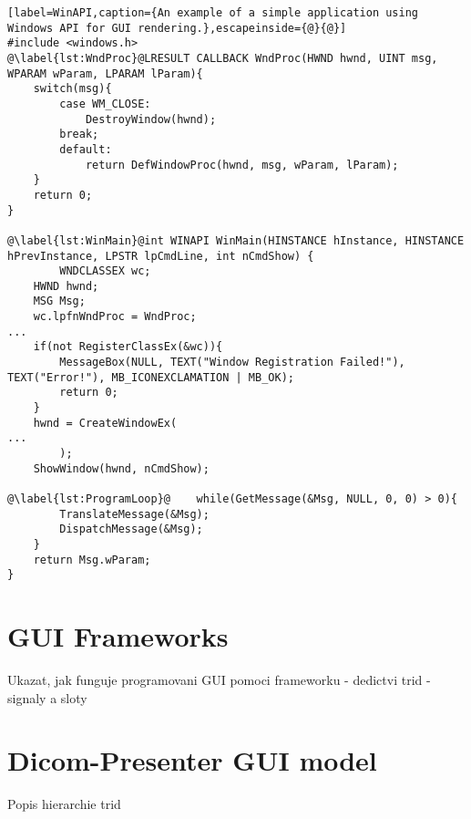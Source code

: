 \begin{lstlisting}[label=WinAPI,caption={An example of a simple application using Windows API for GUI rendering.},escapeinside={@}{@}]
#include <windows.h>
@\label{lst:WndProc}@LRESULT CALLBACK WndProc(HWND hwnd, UINT msg, WPARAM wParam, LPARAM lParam){
    switch(msg){
        case WM_CLOSE:
            DestroyWindow(hwnd);
        break;
        default:
            return DefWindowProc(hwnd, msg, wParam, lParam);
    }
    return 0;
}

@\label{lst:WinMain}@int WINAPI WinMain(HINSTANCE hInstance, HINSTANCE hPrevInstance, LPSTR lpCmdLine, int nCmdShow) {
		WNDCLASSEX wc;
    HWND hwnd;
    MSG Msg;
    wc.lpfnWndProc = WndProc;    
...
    if(not RegisterClassEx(&wc)){
        MessageBox(NULL, TEXT("Window Registration Failed!"), TEXT("Error!"), MB_ICONEXCLAMATION | MB_OK);
        return 0;
    }
    hwnd = CreateWindowEx(
...
		);
    ShowWindow(hwnd, nCmdShow);

@\label{lst:ProgramLoop}@    while(GetMessage(&Msg, NULL, 0, 0) > 0){
        TranslateMessage(&Msg);
        DispatchMessage(&Msg);
    }
    return Msg.wParam;
}
\end{lstlisting}

\section*{GUI Frameworks}

Ukazat, jak funguje programovani GUI pomoci frameworku
- dedictvi trid
- signaly a sloty



\section*{Dicom-Presenter GUI model}

Popis hierarchie trid